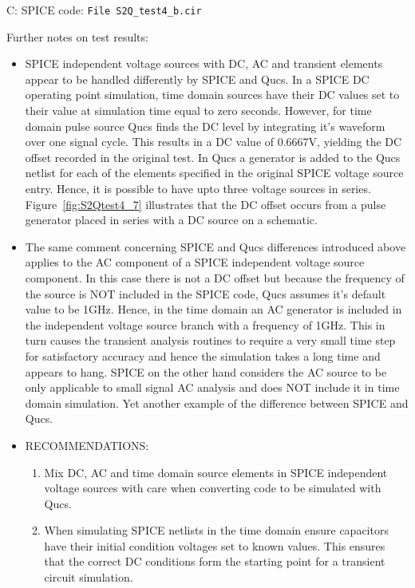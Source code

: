 \begin{flushleft}
 C: SPICE code: \verb|File S2Q_test4_b.cir|

Further notes on test results:
\begin{itemize}
 \item SPICE independent voltage sources with DC, AC and transient elements appear to be handled differently by SPICE and Qucs. In a SPICE DC operating point simulation, time domain sources have their DC values set to their value at simulation time equal to zero seconds. However, for time domain  pulse source Qucs finds the DC level by integrating it's waveform over one signal cycle. This results in a DC value of 0.6667V, yielding the DC offset recorded in the original test. In Qucs a generator is added to the Qucs netlist for each of the elements specified in the original SPICE voltage source entry.  Hence, it is possible to have upto three voltage sources in series. Figure~\ref{fig:S2Qtest4_7} illustrates that the DC offset occurs from a pulse generator placed in series with a DC source on a schematic.
 \item The same comment concerning SPICE and Qucs differences introduced above applies to the AC component of a SPICE independent voltage source component.  In this case there is not a DC offset but because the frequency of the source is NOT included in the SPICE code, Qucs assumes it's default value to be 1GHz.  Hence, in the time domain an AC generator is included in the independent voltage source  branch with a frequency of 1GHz.  This in turn causes the transient analysis routines to require a very small time step for satisfactory accuracy and hence the simulation takes a long time and appears to hang. SPICE on the other hand considers the AC source to be only applicable to small signal AC analysis and does NOT include it in time domain simulation. Yet another example of the difference between SPICE and Qucs. 
 \item RECOMMENDATIONS:
\begin{enumerate}
 \item Mix DC, AC and time domain source elements in SPICE independent voltage sources with care when converting code to be simulated with Qucs.
 \item When simulating SPICE netlists in the time domain ensure capacitors have their initial condition voltages set to known values. This ensures that the correct DC conditions form the starting point for a transient circuit simulation.
\end{enumerate}

\end{itemize}

\end{flushleft}




